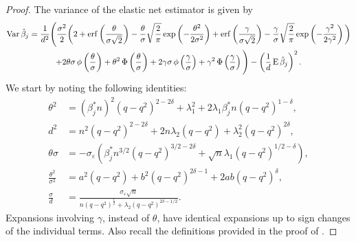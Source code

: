 \begin{proof}
  The variance of the elastic net estimator is given by
  \begin{multline}
    \label{eq:varthm-var}
    \operatorname{Var} \hat{\beta}_j = \frac{1}{d^2}\Bigg( \frac{\sigma^2}{2}\bigg(2 + \operatorname{erf}\left(\frac{\theta}{\sigma \sqrt{2}}\right) - \frac{\theta}{\sigma}\sqrt{\frac{2}{\pi}} \exp\left(-\frac{\theta^2}{2\sigma^2}\right) + \operatorname{erf}\left(\frac{\gamma}{\sigma\sqrt{2}}\right) - \frac{\gamma}{\sigma} \sqrt{\frac{2}{\pi}} \exp\left(- \frac{\gamma^2}{2\gamma^2}\right)\bigg) \\
    + 2\theta\sigma \operatorname{\phi}\left(\frac{\theta}{\sigma}\right) + \theta^2 \operatorname{\Phi}\left(\frac{\theta}{\sigma}\right) + 2\gamma \sigma \operatorname{\phi}\left(\frac{\gamma}{\sigma}\right) + \gamma^2 \operatorname{\Phi}\left(\frac{\gamma}{\sigma}\right) \Bigg)
    - \left(\frac{1}{d}\operatorname{E} \hat{\beta}_j\right)^2.
  \end{multline}
  We start by noting the following identities:
  \[
    \begin{aligned}
      \theta^2                  & = \left(\beta_j^* n\right)^2 (q-q^2)^{2-2\delta} + \lambda_1^2 + 2\lambda_1 \beta_j^* n(q-q^2)^{1-\delta},              \\
      d^2                       & = n^2(q -q^2)^{2 - 2\delta} + 2n\lambda_2 (q-q^2) + \lambda_2^2 (q-q^2)^{2\delta},                                      \\
      \theta \sigma             & =  -\sigma_\varepsilon\left(\beta_j^* n^{3/2}(q- q^2)^{3/2-2\delta} + \sqrt{n} \lambda_1 (q-q^2)^{1/2 - \delta}\right), \\
      \frac{\theta^2}{\sigma^2} & = a^2(q-q^2) + b^2(q-q^2)^{2\delta - 1} + 2ab (q -q^2)^\delta,                                                          \\
      \frac{\sigma}{d}          & = \frac{\sigma_\varepsilon \sqrt{n}}{n(q-q^2)^\frac{1}{2} + \lambda_2 (q-q^2)^{2\delta - 1/2}}.
    \end{aligned}
  \]
  Expansions involving \(\gamma\), instead of \(\theta\), have identical expansions up to sign changes of the individual terms.
  Also recall the definitions provided in the proof of .


\end{proof}
